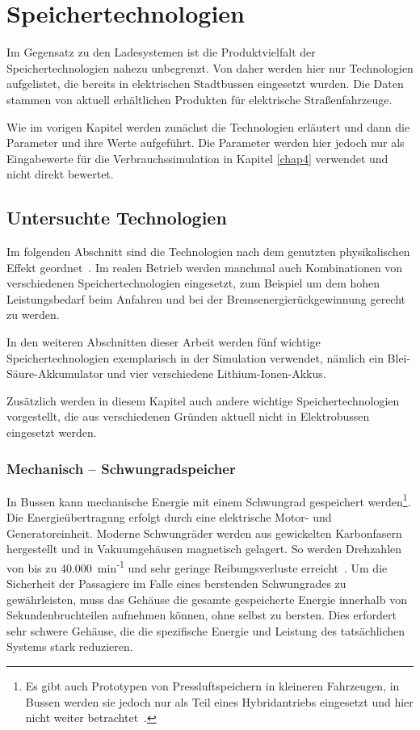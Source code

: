 \chapter{Speichertechnologien}
Im Gegensatz zu den Ladesystemen ist die Produktvielfalt der Speichertechnologien nahezu unbegrenzt. Von daher werden hier nur Technologien aufgelistet, die bereits in elektrischen Stadtbussen eingesetzt wurden. Die Daten stammen von aktuell erhältlichen Produkten für elektrische Straßenfahrzeuge.

Wie im vorigen Kapitel werden zunächst die Technologien erläutert und dann die Parameter und ihre Werte aufgeführt. Die Parameter werden hier jedoch nur als Eingabewerte für die Verbrauchssimulation in Kapitel \ref{chap4} verwendet und nicht direkt bewertet.

\section{Untersuchte Technologien}
Im folgenden Abschnitt sind die Technologien nach dem genutzten physikalischen Effekt geordnet~\cite[S. 35f]{Sterner:2014}. Im realen Betrieb werden manchmal auch Kombinationen von verschiedenen Speichertechnologien eingesetzt, zum Beispiel um dem hohen Leistungsbedarf beim Anfahren und bei der Bremsenergierückgewinnung gerecht zu werden.

In den weiteren Abschnitten dieser Arbeit werden fünf wichtige Speichertechnologien exemplarisch in der Simulation verwendet, nämlich ein Blei-Säure-Akkumulator und vier verschiedene Lithium-Ionen-Akkus. 

Zusätzlich werden in diesem Kapitel auch andere wichtige Speichertechnologien vorgestellt, die aus verschiedenen Gründen aktuell nicht in Elektrobussen eingesetzt werden.

\subsection{Mechanisch – Schwungradspeicher}
In Bussen kann mechanische Energie mit einem Schwungrad gespeichert werden\footnote{Es gibt auch Prototypen von Pressluftspeichern in kleineren Fahrzeugen, in Bussen werden sie jedoch nur als Teil eines Hybridantriebs eingesetzt und hier nicht weiter betrachtet~\cite[S. 14]{Sebastian-Naumann:2014}.}. Die Energieübertragung erfolgt durch eine elektrische Motor- und Generatoreinheit. Moderne Schwungräder werden aus gewickelten Karbonfasern hergestellt und in Vakuumgehäusen magnetisch gelagert. So werden Drehzahlen von bis zu 40.000~min\textsuperscript{-1} und sehr geringe Reibungsverluste erreicht~\cite{993788}. Um die Sicherheit der Passagiere im Falle eines berstenden Schwungrades zu gewährleisten, muss das Gehäuse die gesamte gespeicherte Energie innerhalb von Sekundenbruchteilen aufnehmen können, ohne selbst zu bersten. Dies erfordert sehr schwere Gehäuse, die die spezifische Energie und Leistung des tatsächlichen Systems stark reduzieren.

